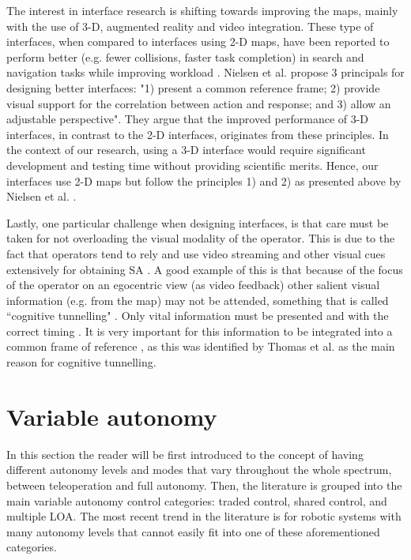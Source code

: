 \documentclass[a4paper,12pt,oneside,openright]{bhamthesis}
\begin{document}
The interest in interface research is shifting towards improving the maps, mainly with the use of 3-D, augmented reality and video integration. These type of interfaces, when compared to interfaces using 2-D maps, have been reported to perform better (e.g. fewer collisions, faster task completion) in search and navigation tasks while improving workload \cite{Yanco2006, Bruemmer2005, Nielsen2007a}. Nielsen et al. \cite{Nielsen2007a} propose 3 principals for designing better interfaces: "1) present a common reference frame; 2) provide visual support for the correlation between action and response; and 3) allow an adjustable perspective". They argue that the improved performance of 3-D interfaces, in contrast to the 2-D interfaces, originates from these principles. In the context of our research, using a 3-D interface would require significant development and testing time without providing scientific merits. Hence, our interfaces use 2-D maps but follow the principles 1) and 2) as presented above by Nielsen et al. \cite{Nielsen2007a}.

Lastly, one particular challenge when designing interfaces, is that care must be taken for not overloading the visual modality of the operator. This is due to the fact that operators tend to rely and use video streaming and other visual cues extensively for obtaining SA \cite{Yanco2006,Baker2004}. A good example of this is that because of the focus of the operator on an egocentric view (as video feedback) other salient visual information (e.g. from the map) may not be attended, something that is called ``cognitive tunnelling" \cite{Thomas2001}. Only vital information must be presented and with the correct timing \cite{Scholtz2004a}. It is very important for this information to be integrated into a common frame of reference \cite{Nielsen2007a,Scholtz2004a}, as this was identified by Thomas et al. \cite{Thomas2001} as the main reason for cognitive tunnelling.

\section{Variable autonomy}
In this section the reader will be first introduced to the concept of having different autonomy levels and modes that vary throughout the whole spectrum, between teleoperation and full autonomy. Then, the literature is grouped into the main variable autonomy control categories: traded control, shared control, and multiple LOA. The most recent trend in the literature is for robotic systems with many autonomy levels that cannot easily fit into one of these aforementioned categories. 
\end{document}
